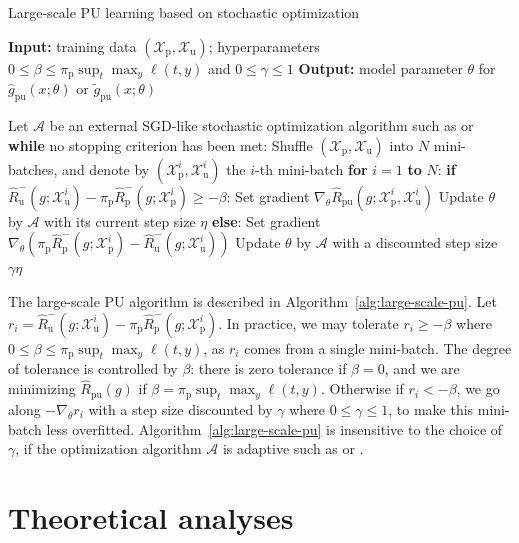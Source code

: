 \documentclass{article}
\newcommand{\cA}{\mathcal{A}}
\newcommand{\cX}{\mathcal{X}}
\newcommand{\pip}{\pi_\mathrm{p}}
\newcommand{\Xp}{\cX_\mathrm{p}}
\newcommand{\Xu}{\cX_\mathrm{u}}
\newcommand{\hRp}{\widehat{R}_\mathrm{p}}
\newcommand{\hRu}{\widehat{R}_\mathrm{u}}
\newcommand{\hRpu}{\widehat{R}_\mathrm{pu}}
\newcommand{\hgpu}{\widehat{g}_\mathrm{pu}}
\newcommand{\tgpu}{\widetilde{g}_\mathrm{pu}}
\begin{document}
\begin{algorithm}[t]
  \caption{Large-scale PU learning based on stochastic optimization}
  \label{alg:large-scale-pu}
  \begin{algorithmic}
    \STATE \textbf{Input:} training data $(\Xp,\Xu)$;
    \STATE \qquad\quad hyperparameters $0\le\beta\le\pip\sup_t\max_y\ell(t,y)$ and $0\le\gamma\le1$
    \STATE \textbf{Output:} model parameter $\theta$ for $\hgpu(x;\theta)$ or $\tgpu(x;\theta)$
  \end{algorithmic}
  \begin{algorithmic}[1]
    \STATE Let $\cA$ be an external SGD-like stochastic optimization algorithm such as \cite{kingma15iclr} or \cite{duchi11jmlr}
    \STATE \textbf{while} no stopping criterion has been met:
    \STATE \quad Shuffle $(\Xp,\Xu)$ into $N$ mini-batches,
      and denote by $(\Xp^i,\Xu^i)$ the $i$-th mini-batch
    \STATE \quad \textbf{for} $i=1$ \textbf{to} $N$:
    \STATE \qquad \textbf{if} $\hRu^-(g;\Xu^i)-\pip\hRp^-(g;\Xp^i)\ge-\beta$:
    \STATE \qquad\quad Set gradient $\nabla_\theta\hRpu(g;\Xp^i,\Xu^i)$
    \STATE \qquad\quad Update $\theta$ by $\cA$ with its current step size $\eta$
    \STATE \qquad \textbf{else}:
    \STATE \qquad\quad Set gradient $\nabla_\theta(\pip\hRp^-(g;\Xp^i)-\hRu^-(g;\Xu^i))$
    \STATE \qquad\quad Update $\theta$ by $\cA$ with a discounted step size $\gamma\eta$
  \end{algorithmic}
\end{algorithm}

The large-scale PU algorithm is described in Algorithm~\ref{alg:large-scale-pu}. Let $r_i=\hRu^-(g;\Xu^i)-\pip\hRp^-(g;\Xp^i)$. In practice, we may tolerate $r_i\ge-\beta$ where $0\le\beta\le\pip\sup_t\max_y\ell(t,y)$, as $r_i$ comes from a single mini-batch. The degree of tolerance is controlled by $\beta$: there is zero tolerance if $\beta=0$, and we are minimizing $\hRpu(g)$ if $\beta=\pip\sup_t\max_y\ell(t,y)$. Otherwise if $r_i<-\beta$, we go along $-\nabla_\theta r_i$ with a step size discounted by $\gamma$ where $0\le\gamma\le1$, to make this mini-batch less overfitted. Algorithm~\ref{alg:large-scale-pu} is insensitive to the choice of $\gamma$, if the optimization algorithm $\cA$ is adaptive such as \cite{kingma15iclr} or \cite{duchi11jmlr}.

\section{Theoretical analyses}
\label{sec:theory}%
\end{document}
